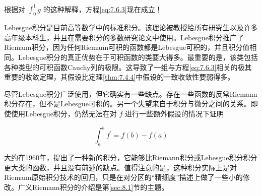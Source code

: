 根据对 \({\int }_{0}^{1}g\) 的这种解释，方程\eqref{eq:7.6.3}现在成立！

Lebesgue积分是目前高等数学中的标准积分。该理论被教授给所有研究生以及许多高年级本科生，并且在需要积分的多数研究论文中使用。Lebesgue积分推广了Riemann积分，因为任何Riemann可积的函数都是Lebesgue可积的，并且积分值相同。Lebesgue积分的真正优势在于可积函数的类要大得多。最重要的是，该类包括各种类型的可积函数Cauchy列的极限。这导致了一组与方程\eqref{eq:7.6.3}相关的极其重要的收敛定理，其假设比定理\ref{thm:7.4.4}中假设的一致收敛性要弱得多。

尽管Lebesgue积分广泛使用，但它确实有一些缺点。存在一些函数的反常Riemann积分存在，但不是Lebesgue可积的。另一个失望来自于积分与微分之间的关系。即使使用Lebesgue积分，仍然无法在对 \(f\) 进行一些额外假设的情况下证明

\[
{\int }_{a}^{b}{f}^{\prime } = f\left( b\right)  - f\left( a\right)
\]

大约在1960年，提出了一种新的积分，它能够比Riemann积分或Lebesgue积分积分更大类的函数，并且没有前述的缺点。值得注意的是，这种积分实际上是对Riemann原始积分技术的回归，只是在对分区的“精细度”描述上做了一些小的修改。广义Riemann积分的介绍是第\ref{sec:8.1}节的主题。

